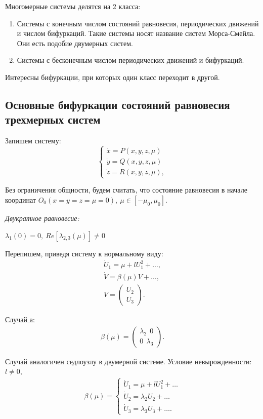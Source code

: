 Многомерные системы делятся на 2 класса:
\begin{enumerate}
	\item Системы с конечным числом состояний равновесия, периодических движений и числом бифуркаций. Такие системы носят название систем Морса-Смейла. Они есть подобие двумерных систем.
	\item Системы с бесконечным числом периодических движений и бифуркаций. 
\end{enumerate}

Интересны бифуркации, при которых один класс переходит в другой.

\subsection{Основные бифуркации состояний равновесия трехмерных систем}
Запишем систему:
\begin{equation}
	\begin{cases}
		\dot x = P(x, y, z, \mu) \\
		\dot y = Q(x, y, z, \mu) \\
		\dot z = R(x, y, z, \mu),
	\end{cases}
	\label{eq:107}	
\end{equation}

Без ограничения общности, будем считать, что состояние равновесия в начале координат $O_0(x=y=z=\mu=0),~\mu \in [-\mu_0,\mu_0]$.

\textit{Двукратное равновесие:}

$\lambda_1(0)=0,~Re[\lambda_{2,3}(\mu)] \neq 0$

Перепишем, приведя систему к нормальному виду:
\begin{gather*}
	\dot U_1 = \mu+lU_1^2+\dots, \\
	\dot V=\beta(\mu)V+\dots, \\
	V=
	\begin{pmatrix}
		U_2 \\
		U_3
	\end{pmatrix}
	.
\end{gather*}

\underline{Случай а:}
\begin{gather*}
	\beta(\mu)=
	\begin{pmatrix}
		\lambda_2~~0 \\
		0~~\lambda_3
	\end{pmatrix}
	.
\end{gather*}

Случай аналогичен седлоузлу в двумерной системе. Условие невырожденности: $l\neq 0$,
\begin{gather*}
	\beta(\mu)=
	\begin{cases}
		\dot U_1 = \mu+lU_1^2+\dots \\
		\dot U_2 = \lambda_2U_2+\dots \\
		\dot U_3 = \lambda_3U_3+\dots.
	\end{cases}
\end{gather*}

